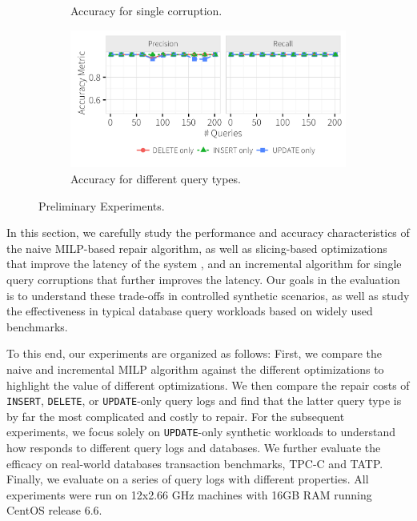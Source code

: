 \begin{figure}[h]
\begin{subfigure}[t]{.3\textwidth}
    \vspace*{-.3in}
    \caption{Accuracy for single corruption.}
    \label{f:singlequeryinc_acc} 
    \end{subfigure}
    \begin{subfigure}[t]{.3\textwidth}
    \includegraphics[width = .99\columnwidth]{figures/indelup_pr}
    \vspace*{-.3in}
    \caption{Accuracy for different query types.}
    \label{f:indelup_acc} 
    \end{subfigure}
    \vspace*{-.1in}
    \caption{Preliminary Experiments.}
  \end{figure}


In this section, we carefully study the performance and accuracy
characteristics of the naive MILP-based repair algorithm, as well as 
slicing-based optimizations that improve the latency of the system
, and an incremental algorithm for single query corruptions that
further improves the latency. 
Our goals in the evaluation is to understand these trade-offs in
controlled synthetic scenarios, as well as study the effectiveness
in typical database query workloads based on widely used benchmarks.

To this end, our experiments are organized as follows: First, 
we compare the naive and incremental MILP algorithm against the different optimizations 
to highlight the value of different optimizations.  We then compare the
repair costs of \texttt{INSERT}, \texttt{DELETE}, or \texttt{UPDATE}-only query logs 
and find that the latter query type is by far the most complicated and costly to repair.
For the subsequent experiments, we focus solely on \texttt{UPDATE}-only synthetic workloads 
to understand how \sys responds to different query logs and databases.  
We further evaluate the efficacy on real-world databases transaction benchmarks,
TPC-C and TATP. Finally, we evaluate \sys on a series of query logs with different properties. 
All experiments were run on 12x2.66 GHz  machines with 16GB RAM running CentOS release 6.6.




